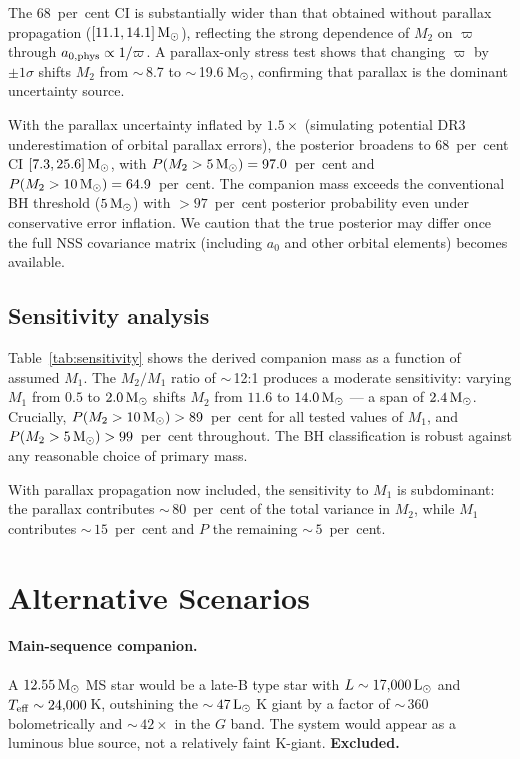 \documentclass[usenatbib,fleqn]{mnras}
\newcommand{\Msun}{{\rm M}_\odot}
\newcommand{\Lsun}{{\rm L}_\odot}
\begin{document}
The 68~per~cent CI is substantially wider than that obtained without
parallax propagation ($[11.1, 14.1]\,\Msun$), reflecting the
strong dependence of $M_2$ on $\varpi$ through
$a_{0,{\rm phys}} \propto 1/\varpi$.  A parallax-only stress test
shows that changing $\varpi$ by $\pm 1\sigma$ shifts $M_2$ from
$\sim$\,8.7 to $\sim$\,19.6$\,\Msun$, confirming that parallax
is the dominant uncertainty source.

With the parallax uncertainty inflated by $1.5\times$
(simulating potential DR3 underestimation of orbital parallax
errors), the posterior broadens to 68~per~cent CI
$[7.3, 25.6]\,\Msun$, with $P(M_2 > 5\,\Msun) = 97.0$~per~cent
and $P(M_2 > 10\,\Msun) = 64.9$~per~cent.
The companion mass exceeds the conventional BH threshold
($5\,\Msun$) with $>97$~per~cent posterior probability even under
conservative error inflation.  We caution that the true posterior
may differ once the full NSS covariance matrix (including $a_0$
and other orbital elements) becomes available.

\subsection{Sensitivity analysis}
\label{sec:results:sensitivity}

Table~\ref{tab:sensitivity} shows the derived companion mass as a
function of assumed $M_1$.  The $M_2/M_1$ ratio of $\sim$\,12:1
produces a moderate sensitivity: varying $M_1$ from $0.5$ to
$2.0\,\Msun$ shifts $M_2$ from $11.6$ to $14.0\,\Msun$ ---
a span of $2.4\,\Msun$.  Crucially,
$P(M_2 > 10\,\Msun) > 89$~per~cent for all tested values of
$M_1$, and $P(M_2 > 5\,\Msun) > 99$~per~cent throughout.
The BH classification is robust against any reasonable choice
of primary mass.

With parallax propagation now included, the sensitivity to $M_1$
is subdominant: the parallax contributes $\sim$\,$80$~per~cent
of the total variance in $M_2$, while $M_1$ contributes
$\sim$\,$15$~per~cent and $P$ the remaining $\sim$\,$5$~per~cent.

\section{Alternative Scenarios}
\label{sec:alternatives}

\paragraph{Main-sequence companion.}
A $12.55\,\Msun$ MS star would be a late-B type star with
$L \sim 17{,}000\,\Lsun$ and $T_{\rm eff} \sim 24{,}000$\,K,
outshining the $\sim$\,$47\,\Lsun$ K giant by a factor of
$\sim$\,$360$ bolometrically and $\sim$\,$42\times$ in the
$G$ band.  The system would appear as a luminous blue source,
not a relatively faint K-giant.  \textbf{Excluded.}
\end{document}
